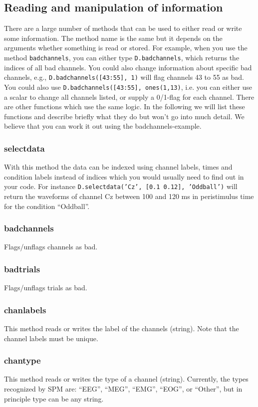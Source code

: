 \subsection{Reading and manipulation of information}
There are a large number of methods that can be used to either read or write some information. The method name is the same but it depends on the arguments whether something is read or stored. For example, when you use the method \texttt{badchannels}, you can either type \texttt{D.badchannels}, which returns the indices of all bad channels. You could also change information about specific bad channels, e.g., \texttt{D.badchannels([43:55], 1)} will flag channels 43 to 55 as bad. You   could also use \texttt{D.badchannels([43:55], ones(1,13)}, i.e. you can either use a scalar to change all channels listed, or supply a 0/1-flag for each channel. There are other functions which use the same logic. In the following we will list these functions and describe briefly what they do but won't go into much detail. We believe that you can work it out using the badchannels-example.

\subsubsection{selectdata}
With this method the data can be indexed using channel labels, times and condition labels instead of indices which you would usually need to find out in your code. For instance \texttt{D.selectdata('Cz', [0.1 0.12], 'Oddball')} will return the waveforms of channel Cz between 100 and 120 ms in peristimulus time for the condition ``Oddball''.

\subsubsection{badchannels}
Flags/unflags channels as bad. 

\subsubsection{badtrials}
Flags/unflags trials as bad. 

\subsubsection{chanlabels}
This method reads or writes the label of the channels (string).  Note that the channel labels must be unique.

\subsubsection{chantype}
This method reads or writes the type of a channel (string). Currently, the types recognized by SPM are: ``EEG'', ``MEG'', ``EMG'', ``EOG'', or ``Other'', but in principle type can be any string.

